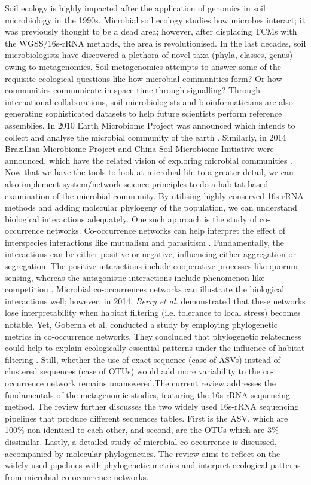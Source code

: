 Soil ecology is highly impacted after the application of genomics in soil microbiology in the 1990s. Microbial soil ecology studies how microbes interact; it was previously thought to be a dead area; however, after displacing TCMs with the WGSS/16s-rRNA methods, the area is revolutionised. In the last decades, soil microbiologists have discovered a plethora of novel taxa (phyla, classes, genus) owing to metagenomics. Soil metagenomics attempts to answer some of the requisite ecological questions like how microbial communities form? Or how communities communicate in space-time through signalling? Through international collaborations, soil microbiologists and bioinformaticians are also generating sophisticated datasets to help future scientists perform reference assemblies. In 2010 Earth Microbiome Project was announced which intends to collect and analyse the microbial community of the earth \cite{ref6}. Similarly, in 2014 Brazillian Microbiome Project and China Soil Microbiome Initiative were announced, which have the related vision of exploring microbial communities \cite{ref7}\cite{ref8}. Now that we have the tools to look at microbial life to a greater detail, we can also implement system/network science principles to do a habitat-based examination of the microbial community. By utilising highly conserved 16s rRNA methods and adding molecular phylogeny of the population, we can understand biological interactions adequately. One such approach is the study of co-occurrence networks. Co-occurrence networks can help interpret the effect of interspecies interactions like mutualism and parasitism \cite{ref9}. Fundamentally, the interactions can be either positive or negative, influencing either aggregation or segregation. The positive interactions include cooperative processes like quorum sensing, whereas the antagonistic interactions include phenomenon like competition \cite{ref9}. Microbial co-occurrences networks can illustrate the biological interactions well; however, in 2014, \emph{Berry et al.} demonstrated that these networks lose interpretability when habitat filtering (i.e. tolerance to local stress) becomes notable. Yet, Goberna et al. conducted a study by employing phylogenetic metrics in co-occurrence networks. They concluded that phylogenetic relatedness could help to explain ecologically essential patterns under the influence of habitat filtering \cite{ref10}. Still, whether the use of exact sequence (case of ASVs) instead of clustered sequences (case of OTUs) would add more variability to the co-occurrence network remains unanswered.\newline \newline The current review addresses the fundamentals of the metagenomic studies, featuring the 16s-rRNA sequencing method. The review further discusses the two widely used 16s-rRNA sequencing pipelines that produce different sequences tables. First is the ASV, which are 100\% non-identical to each other, and second, are the OTUs which are 3\% dissimilar. Lastly, a detailed study of microbial co-occurrence is discussed, accompanied by molecular phylogenetics. The review aims to reflect on the widely used pipelines with phylogenetic metrics and interpret ecological patterns from microbial co-occurrence networks.